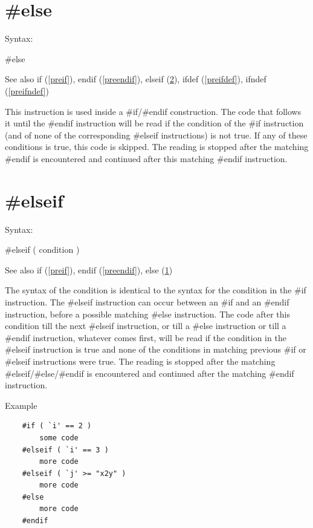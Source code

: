 
\section{\#else}
\label{preelse}

\noindent Syntax:

\#else
 
\noindent See also if (\ref{preif}),
            endif (\ref{preendif}),
            elseif (\ref{preelseif}),
            ifdef (\ref{preifdef}),
            ifndef (\ref{preifndef})

\noindent This instruction is used inside a 
\#if/\#endif construction. The code that follows 
it until the \#endif instruction will be read if the condition of the \#if 
instruction (and of none of the corresponding \#elseif 
instructions) is not true. If any of these conditions is true, this code is 
skipped. The reading is stopped after the matching \#endif is encountered 
and continued after this matching \#endif instruction.


\section{\#elseif}
\label{preelseif}

\noindent Syntax:

\#elseif ( condition )
 
\noindent See also if (\ref{preif}),
            endif (\ref{preendif}),
            else (\ref{preelse})

\noindent The syntax of the condition is identical to the 
syntax for the condition in the \#if instruction. The \#elseif 
instruction can occur between an \#if and an \#endif 
instruction, before a possible matching \#else instruction. 
The code after this condition till the next \#elseif instruction, or till a 
\#else instruction or till a \#endif instruction, whatever comes first, 
will be read if the condition in the \#elseif instruction is true and none 
of the conditions in matching previous \#if or \#elseif instructions were 
true. The reading is stopped after the matching \#elseif/\#else/\#endif is 
encountered and continued after the matching \#endif instruction.

Example
\begin{verbatim}
    #if ( `i' == 2 )
        some code
    #elseif ( `i' == 3 )
        more code
    #elseif ( `j' >= "x2y" )
        more code
    #else
        more code
    #endif
\end{verbatim}

